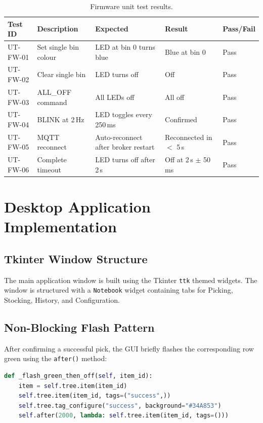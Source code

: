 \begin{table}[H]
  \centering
  \caption{Firmware unit test results.}
  \label{tab:fw-unit-tests}
  \begin{tabular}{p{2.5cm} p{4cm} p{2.5cm} p{2.5cm} p{1.5cm}}
    \toprule
    \textbf{Test ID} & \textbf{Description} & \textbf{Expected} & \textbf{Result} & \textbf{Pass/Fail} \\
    \midrule
    UT-FW-01 & Set single bin colour & LED at bin 0 turns blue & Blue at bin 0 & Pass \\
    UT-FW-02 & Clear single bin & LED turns off & Off & Pass \\
    UT-FW-03 & ALL\_OFF command & All LEDs off & All off & Pass \\
    UT-FW-04 & BLINK at 2\,Hz & LED toggles every 250\,ms & Confirmed & Pass \\
    UT-FW-05 & MQTT reconnect & Auto-reconnect after broker restart & Reconnected in $<$ 5\,s & Pass \\
    UT-FW-06 & Complete timeout & LED turns off after 2\,s & Off at 2\,s $\pm$ 50\,ms & Pass \\
    \bottomrule
  \end{tabular}
\end{table}

\section{Desktop Application Implementation}
\label{sec:app-implementation}

\subsection{Tkinter Window Structure}
\label{sec:tkinter-structure}

The main application window is built using the Tkinter \texttt{ttk} themed widgets. The window is structured with a \texttt{Notebook} widget containing tabs for Picking, Stocking, History, and Configuration.

\subsection{Non-Blocking Flash Pattern}
\label{sec:flash-pattern}

After confirming a successful pick, the GUI briefly flashes the corresponding row green using the \texttt{after()} method:

\begin{lstlisting}[language=Python, caption=Non-blocking green flash using after(), label=lst:flash]
def _flash_green_then_off(self, item_id):
    item = self.tree.item(item_id)
    self.tree.item(item_id, tags=("success",))
    self.tree.tag_configure("success", background="#34A853")
    self.after(2000, lambda: self.tree.item(item_id, tags=()))
\end{lstlisting}

